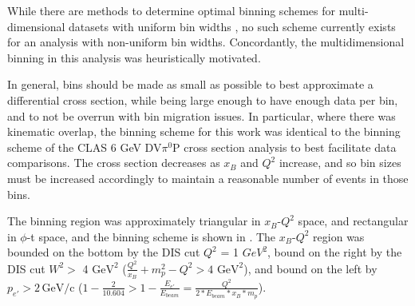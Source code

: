 
While there are methods to determine optimal binning schemes for multi-dimensional datasets with uniform bin widths \parencite{Knuth2019OptimalModels}, no such scheme currently exists for an analysis with non-uniform bin widths. Concordantly, the multidimensional binning in this analysis was heuristically motivated.


In general, bins should be made as small as possible to best approximate a differential cross section, while being large enough to have enough data per bin, and to not be overrun with bin migration issues. In particular, where there was kinematic overlap, the binning scheme for this work was identical to the binning scheme of the CLAS 6 GeV DV$\pi^0$P cross section analysis \parencite{Bedlinskiy2014ExclusiveCLAS} to best facilitate data comparisons. The cross section decreases as $x_B$ and $Q^2$ increase, and so bin sizes must be increased accordingly to maintain a reasonable number of events in those bins. 

The binning region was approximately triangular in $x_B$-$Q^2$ space, and rectangular in $\phi$-t space, and the binning scheme is shown in . The $x_B$-$Q^2$ region was bounded on the bottom by the DIS cut $Q^2$ = 1 $GeV^2$, bound on the right by the DIS cut $W^2 > $ 4 $\text{GeV}^2$ ($\frac{Q^2}{x_B}+m_p^2-Q^2>4$  $\text{GeV}^2$), and bound on the left by $p_{e'} > 2 \, \text{GeV/c}$ ($1-\frac{2}{10.604} > 1-\frac{E_{e'}}{E_{beam}} = \frac{Q^2}{2*E_{beam}*x_B*m_p}$). 


